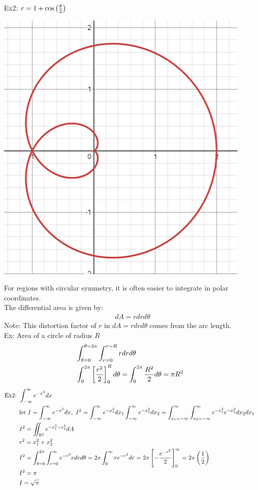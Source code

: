 \documentclass[11pt, fleqn]{article}
\begin{document}
Ex2: $r=1+\cos\left( \frac{\theta}{2} \right)$\\
\centerline{\includegraphics[scale=0.7]{PreCalcPictures/PolarGraph2.png}}

For regions with circular symmetry, it is often easier to integrate in polar coordinates.\\
The differential area is given by:
\begin{align*}
    &dA=rdrd\theta
\end{align*}
Note: This distortion factor of $r$ in $dA=rdrd\theta$ comes from the arc length.\\
Ex: Area of a circle of radius $R$
\begin{align*}
    &\int_{\theta=0}^{\theta=2\pi}\int_{r=0}^{r=R}rdrd\theta\\
    &\int_0^{2\pi}\left[ \frac{r^2}{2} \right]_0^Rd\theta=\int_0^{2\pi}\frac{R^2}{2}d\theta=\pi R^2
\end{align*}
\begin{align*}
    \text{Ex2: }&\int_{-\infty}^\infty e^{-x^2}dx\\
    &\text{let }I=\int_{-\infty}^\infty e^{-x^2}dx,\ I^2=\int_{-\infty}^\infty e^{-x_1^2}dx_1\int_{-\infty}^\infty e^{-x_2^2}dx_2=\int_{x_1=-\infty}^\infty\int_{x_2=-\infty}^\infty e^{-x_1^2}e^{-x_2^2}dx_2dx_1\\
    &I^2=\iint_{\R^2}e^{-x_1^2-x_2^2}dA\\
    &r^2=x_1^2+x_2^2\\
    &I^2=\int_{\theta=0}^{2\pi}\int_{r=0}^\infty e^{-r^2}rdrd\theta=2\pi\int_0^\infty re^{-r^2}dr=2\pi\brsquare{-\frac{e^{-r^2}}{2}}_0^\infty=2\pi\brround{\frac{1}{2}}\\
    &I^2=\pi\\
    &I=\sqrt{\pi}
    \end{align*}
\end{document}
